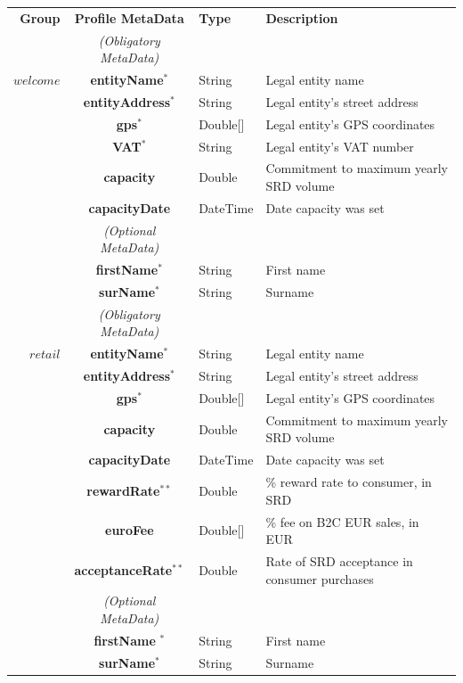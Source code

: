 \setlength{\tabcolsep}{10pt}
\begin{table}[H]
\begin{centering}
\small
{
\begin{tabular}{ r | c | l | l }
\hline
\textbf{Group}	& {\bf Profile MetaData} & {\bf Type} & {\bf Description} \\
\Xhline{1.5pt}
			& \emph{(Obligatory MetaData)} & & \\
\cline{2-2}
$welcome$	& {\bf entityName}$^*$		&String	& Legal entity name \\
			& {\bf entityAddress}$^*$		&String	& Legal entity's street address \\
			& {\bf gps}$^*$				&Double[]	& Legal entity's GPS coordinates \\			
			& {\bf VAT}$^*$				&String	& Legal entity's VAT number \\
			& {\bf capacity}				&Double	& Commitment to maximum yearly SRD volume \\
			& {\bf capacityDate}			&DateTime & Date capacity was set \\
\cline{2-2}
			 & \emph{(Optional MetaData)}& & \\
\cline{2-2}
			& {\bf firstName}$^*$			&String	& First name \\
			& {\bf surName}$^*$			&String	& Surname \\
\Xhline{1.5pt}
			& \emph{(Obligatory MetaData)} & & \\
\cline{2-2}
$retail$		& {\bf entityName}$^*$		&String	& Legal entity name \\
			& {\bf entityAddress}$^*$		&String	& Legal entity's street address \\
			& {\bf gps}$^*$				&Double[]	& Legal entity's GPS coordinates \\			
			& {\bf capacity}				&Double	& Commitment to maximum yearly SRD volume \\
			& {\bf capacityDate}			&DateTime & Date capacity was set \\
			& {\bf rewardRate}$^{**}$		&Double	& \% reward rate to consumer, in SRD \\
			& {\bf euroFee}				&Double[]	& \% fee on B2C EUR sales, in EUR \\
			& {\bf acceptanceRate}$^{**}$	&Double	& Rate of SRD acceptance in consumer purchases\\
\cline{2-2}
			 & \emph{(Optional MetaData)}& & \\
\cline{2-2}
			& {\bf firstName	}$^*$			&String	& First name \\
			& {\bf surName}$^*$			&String	& Surname \\

\end{tabular}}
\end{centering}
\end{table}
